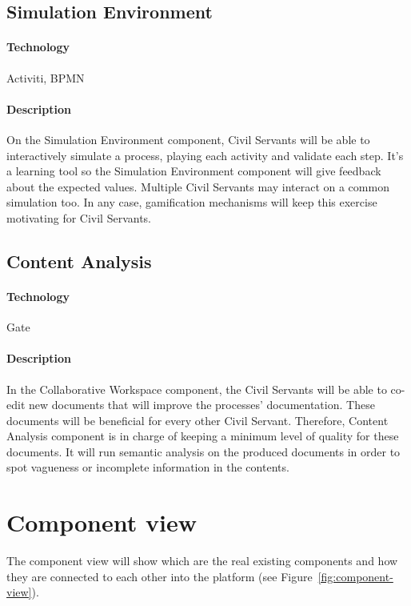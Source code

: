 \documentclass{learnpad}
\begin{document}
\subsection{Simulation Environment}
\label{sec:simulator}

\paragraph{Technology}
Activiti, BPMN

\paragraph{Description}
On the Simulation Environment component, Civil Servants will be able to
interactively simulate a process, playing each activity and validate each step.
It's a learning tool so the Simulation Environment component will give feedback
about the expected values.  Multiple Civil Servants may interact on a common
simulation too.  In any case, gamification mechanisms will keep this exercise
motivating for Civil Servants.

\subsection{Content Analysis}
\label{sec:content-analysis}

\paragraph{Technology}
Gate

\paragraph{Description}
In the Collaborative Workspace component, the Civil Servants will be able to
co-edit new documents that will improve the processes' documentation.  These
documents will be beneficial for every other Civil Servant.  Therefore, Content
Analysis component is in charge of keeping a minimum level of quality for these
documents.  It will run semantic analysis on the produced documents in order to
spot vagueness or incomplete information in the contents.

\section{Component view}
\label{sec:component-view}
The component view will show which are the real existing components and how they
are connected to each other into the \learnpad platform (see
Figure~\ref{fig:component-view}).
\end{document}
